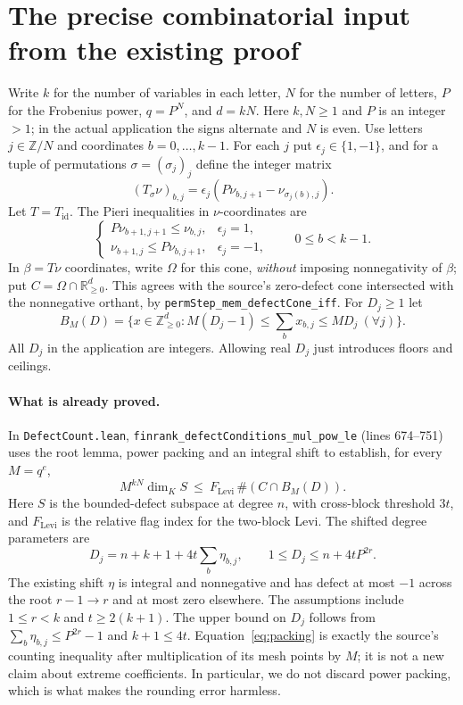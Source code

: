\documentclass[11pt]{article}
\theoremstyle{remark}\newtheorem{remark}[theorem]{Remark}
\newcommand{\Z}{\mathbb Z}\newcommand{\N}{\mathbb N}\newcommand{\R}{\mathbb R}
\newcommand{\code}[1]{\texttt{#1}}
\begin{document}
\section{The precise combinatorial input from the existing proof}
Write $k$ for the number of variables in each letter, $N$ for the number of letters, $P$ for the Frobenius power, $q=P^N$, and $d=kN$. Here $k,N\geq1$ and $P$ is an integer $>1$; in the actual application the signs alternate and $N$ is even. Use letters $j\in\Z/N$ and coordinates $b=0,\ldots,k-1$. For each $j$ put $\epsilon_j\in\{1,-1\}$, and for a tuple of permutations $\sigma=(\sigma_j)_j$ define the integer matrix
\begin{equation}\label{eq:step}
 (T_\sigma\nu)_{b,j}=\epsilon_j(P\nu_{b,j+1}-\nu_{\sigma_j(b),j}).
\end{equation}
Let $T=T_{\mathrm{id}}$. The Pieri inequalities in $\nu$-coordinates are
\begin{equation}\label{eq:pieri}
\begin{cases}
 P\nu_{b+1,j+1}\leq\nu_{b,j},&\epsilon_j=1,\\
 \nu_{b+1,j}\leq P\nu_{b,j+1},&\epsilon_j=-1,
\end{cases}\qquad 0\leq b<k-1.
\end{equation}
In $\beta=T\nu$ coordinates, write $\Omega$ for this cone, \emph{without} imposing nonnegativity of $\beta$; put $C=\Omega\cap\R_{\geq0}^d$. This agrees with the source's zero-defect cone intersected with the nonnegative orthant, by \code{permStep\_mem\_defectCone\_iff}. For $D_j\geq1$ let
\[
 B_M(D)=\{x\in\Z_{\geq0}^{d}:M(D_j-1)\leq\sum_b x_{b,j}\leq MD_j\ (\forall j)\}.
\]
All $D_j$ in the application are integers. Allowing real $D_j$ just introduces floors and ceilings.

\paragraph{What is already proved.} In \code{DefectCount.lean}, \code{finrank\_defectConditions\_mul\_pow\_le} (lines 674--751) uses the root lemma, power packing and an integral shift to establish, for every $M=q^e$,
\begin{equation}\label{eq:packing}
 M^{kN}\dim_K S\ \leq\ F_{\mathrm{Levi}}\,\#(C\cap B_M(D)).
\end{equation}
Here $S$ is the bounded-defect subspace at degree $n$, with cross-block threshold $3t$, and $F_{\mathrm{Levi}}$ is the relative flag index for the two-block Levi. The shifted degree parameters are
\begin{equation}\label{eq:D}
 D_j=n+k+1+4t\sum_b \eta_{b,j},\qquad 1\leq D_j\leq n+4tP^{2r}.
\end{equation}
The existing shift $\eta$ is integral and nonnegative and has defect at most $-1$ across the root $r-1\to r$ and at most zero elsewhere. The assumptions include $1\leq r<k$ and $t\geq2(k+1)$. The upper bound on $D_j$ follows from $\sum_b\eta_{b,j}\leq P^{2r}-1$ and $k+1\leq4t$. Equation~\eqref{eq:packing} is exactly the source's counting inequality after multiplication of its mesh points by $M$; it is not a new claim about extreme coefficients. In particular, we do not discard power packing, which is what makes the rounding error harmless.
\end{document}
